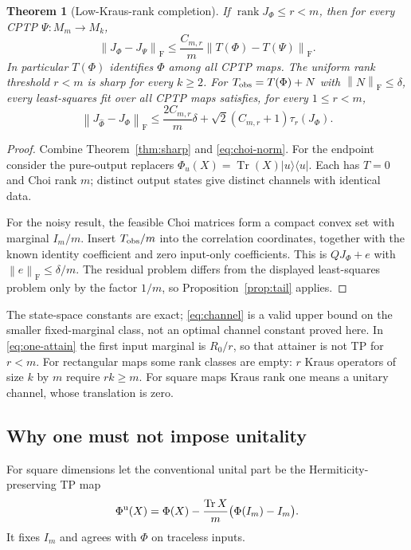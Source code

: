 \documentclass[11pt,a4paper]{article}
\newtheorem{theorem}{Theorem}
\newcommand{\Tr}{\operatorname{Tr}}
\newcommand{\rank}{\operatorname{rank}}
\newcommand{\F}{\mathrm F}
\newcommand{\norm}[1]{\left\lVert#1\right\rVert_{\F}}
\begin{document}
\begin{theorem}[Low-Kraus-rank completion]\label{thm:channel}
If $\rank J_\Phi\le r<m$, then for every CPTP $\Psi:M_m\to M_k$,
\begin{equation}\label{eq:channel}
 \norm{J_\Phi-J_\Psi}
 \le\frac{C_{m,r}}m\norm{T(\Phi)-T(\Psi)}.
\end{equation}
In particular $T(\Phi)$ identifies $\Phi$ among all CPTP maps.
The uniform rank threshold $r<m$ is sharp for every $k\ge2$.
For $T_{\rm obs}=T(\Phi)+N$ with $\norm N\le\delta$, every least-squares
fit over all CPTP maps satisfies, for every $1\le r<m$,
\begin{equation}\label{eq:channel-noise}
 \norm{J_{\widehat\Phi}-J_\Phi}
 \le\frac{2C_{m,r}}m\delta+
       \sqrt2(C_{m,r}+1)\tau_r(J_\Phi).
\end{equation}
\end{theorem}
\begin{proof}
Combine Theorem~\ref{thm:sharp} and \eqref{eq:choi-norm}.
For the endpoint consider the pure-output replacers
$\Phi_u(X)=\Tr(X)|u\rangle\langle u|$.
Each has $T=0$ and Choi rank $m$; distinct output states give distinct
channels with identical data.

For the noisy result, the feasible Choi matrices form a compact convex
set with marginal $I_m/m$. Insert $T_{\rm obs}/m$ into the correlation
coordinates, together with the known identity coefficient and
zero input-only coefficients. This is $QJ_\Phi+e$ with
$\norm e\le\delta/m$.
The residual problem differs from the displayed least-squares problem
only by the factor $1/m$, so Proposition~\ref{prop:tail} applies.
\end{proof}

The state-space constants are exact; \eqref{eq:channel} is a valid upper
bound on the smaller fixed-marginal class, not an optimal channel
constant proved here. In \eqref{eq:one-attain} the first input marginal
is $R_0/r$, so that attainer is not TP for $r<m$.
For rectangular maps some rank classes are empty: $r$ Kraus operators
of size $k$ by $m$ require $rk\ge m$. For square maps Kraus rank one
means a unitary channel, whose translation is zero.

\subsection{Why one must not impose unitality}
For square dimensions let the conventional unital part be the
Hermiticity-preserving TP map
\begin{equation}\label{eq:unital}
 \Phi^{\rm u}(X)=\Phi(X)
       -\frac{\Tr X}{m}\bigl(\Phi(I_m)-I_m\bigr).
\end{equation}
It fixes $I_m$ and agrees with $\Phi$ on traceless inputs.
\end{document}
